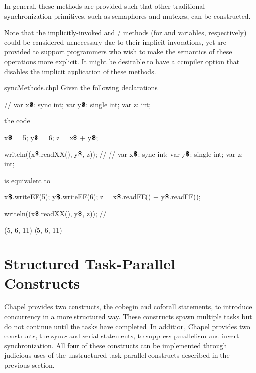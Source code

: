 \begin{rationale}
In general, these methods are provided such that other traditional
synchronization primitives, such as semaphores and mutexes, can be
constructed.

Note that the implicitly-invoked 
and / methods (for 
and  variables, respectively) could be considered
unnecessary due to their implicit invocations, yet are provided to
support programmers who wish to make the semantics of these operations
more explicit.  It might be desirable to have a compiler option that
disables the implicit application of these methods.

\end{rationale}

\begin{chapelexample}{syncMethods.chpl}
Given the following declarations
\begin{chapel}
{ // }
var x$\mbox{{\bf \$}}$: sync int;
var y$\mbox{{\bf \$}}$: single int;
var z: int;
\end{chapel}
the code
\begin{chapel}
x$\mbox{{\bf \$}}$ = 5;
y$\mbox{{\bf \$}}$ = 6;
z = x$\mbox{{\bf \$}}$ + y$\mbox{{\bf \$}}$;
\end{chapel}
\begin{chapelnoprint}
writeln((x$\mbox{{\bf \$}}$.readXX(), y$\mbox{{\bf \$}}$, z));
// {
}
{ // }
var x$\mbox{{\bf \$}}$: sync int;
var y$\mbox{{\bf \$}}$: single int;
var z: int;
\end{chapelnoprint}
is equivalent to
\begin{chapel}
x$\mbox{{\bf \$}}$.writeEF(5);
y$\mbox{{\bf \$}}$.writeEF(6);
z = x$\mbox{{\bf \$}}$.readFE() + y$\mbox{{\bf \$}}$.readFF();
\end{chapel}
\begin{chapelpost}
writeln((x$\mbox{{\bf \$}}$.readXX(), y$\mbox{{\bf \$}}$, z));
// {
}
\end{chapelpost}
\begin{chapeloutput}
(5, 6, 11)
(5, 6, 11)
\end{chapeloutput}
\end{chapelexample}

\section{Structured Task-Parallel Constructs}
\label{structured_task_parallelism}

Chapel provides two constructs, the cobegin and coforall statements,
to introduce concurrency in a more structured way.  These constructs
spawn multiple tasks but do not continue until the tasks have
completed.  In addition, Chapel provides two constructs, the sync- and
serial statements, to suppress parallelism and insert synchronization.
All four of these constructs can be implemented through judicious uses
of the unstructured task-parallel constructs described in the previous
section.

